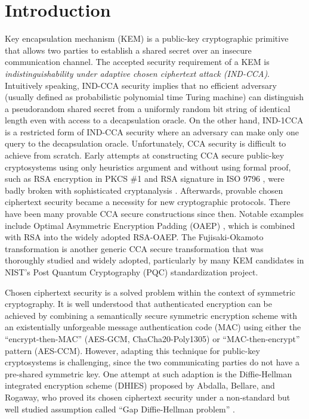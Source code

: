 \documentclass[runningheads]{llncs}
\begin{document}
\section{Introduction}\label{sec:introduction}
Key encapsulation mechanism (KEM) is a public-key cryptographic primitive that allows two parties to establish a shared secret over an insecure communication channel. The accepted security requirement of a KEM is \textit{indistinguishability under adaptive chosen ciphertext attack (IND-CCA)}. Intuitively speaking, IND-CCA security implies that no efficient adversary (usually defined as probabilistic polynomial time Turing machine) can distinguish a pseudorandom shared secret from a uniformly random bit string of identical length even with access to a decapsulation oracle. On the other hand, IND-1CCA is a restricted form of IND-CCA security where an adversary can make only one query to the decapsulation oracle. Unfortunately, CCA security is difficult to achieve from scratch. Early attempts at constructing CCA secure public-key cryptosystems using only heuristics argument and without using formal proof, such as RSA encryption in PKCS \#1 \cite{DBLP:journals/rfc/rfc2313} and RSA signature in ISO 9796 \cite{ISO9796-1}, were badly broken with sophisticated cryptanalysis \cite{DBLP:conf/crypto/Bleichenbacher98,DBLP:conf/eurocrypt/Grieu00,DBLP:conf/crypto/CoronNS99}. Afterwards, provable chosen ciphertext security became a necessity for new cryptographic protocols. There have been many provable CCA secure constructions since then. Notable examples include Optimal Asymmetric Encryption Padding (OAEP) \cite{DBLP:conf/eurocrypt/BellareR94}, which is combined with RSA \cite{DBLP:conf/crypto/FujisakiOPS01} into the widely adopted RSA-OAEP. The Fujisaki-Okamoto transformation \cite{DBLP:conf/crypto/FujisakiO99,DBLP:conf/tcc/HofheinzHK17} is another generic CCA secure transformation that was thoroughly studied and widely adopted, particularly by many KEM candidates in NIST's Post Quantum Cryptography (PQC) standardization project.

Chosen ciphertext security is a solved problem within the context of symmetric cryptography. It is well understood that authenticated encryption can be achieved by combining a semantically secure symmetric encryption scheme with an existentially unforgeable message authentication code (MAC) using either the ``encrypt-then-MAC'' (AES-GCM, ChaCha20-Poly1305) or ``MAC-then-encrypt'' pattern (AES-CCM)\cite{DBLP:conf/asiacrypt/BellareN00,DBLP:conf/crypto/Krawczyk01}. However, adapting this technique for public-key cryptosystems is challenging, since the two communicating parties do not have a pre-shared symmetric key. One attempt at such adaption is the Diffie-Hellman integrated encryption scheme (DHIES) \cite{DBLP:journals/iacr/AbdallaBR99,DBLP:conf/ctrsa/AbdallaBR01} proposed by Abdalla, Bellare, and Rogaway, who proved its chosen ciphertext security under a non-standard but well studied assumption called ``Gap Diffie-Hellman problem'' \cite{DBLP:conf/pkc/OkamotoP01}.
\end{document}
